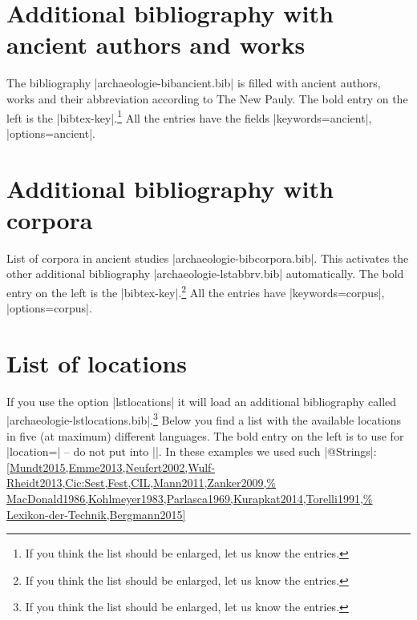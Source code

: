 \documentclass[a4paper,
10pt,
greek,
french,
spanish,
italian,
ngerman,
english
]{ltxdoc}
\begin{document}

\clearpage
\begin{multicols}{2}\footnotesize
\lstlistoflistings
\end{multicols}
\section{Additional bibliography with ancient authors and works}\label{list-bibancient}
The bibliography |archaeologie-bibancient.bib| is filled with ancient authors, works and their abbreviation according to  The New Pauly.
The bold entry on the left is the |bibtex-key|.\footnote{If you think the list should be enlarged, let us know the entries.}
All the entries have the fields  |keywords={ancient}|, |options={ancient}|.

\begin{multicols}{2}
	
\end{multicols}


\section{Additional bibliography with corpora}\label{list-bibcorpora}
List of corpora in ancient studies |archaeologie-bibcorpora.bib|.
This activates the other additional bibliography |archaeologie-lstabbrv.bib| automatically.
The bold entry on the left is the |bibtex-key|.\footnote{If you think the list should be enlarged, let us know the entries.}
All the entries have |keywords={corpus}|, |options={corpus}|.
\begin{multicols}{2}
	
\end{multicols}

\section{List of locations}\label{list-locations}
If you use the option |lstlocations| it will load an additional bibliography called |archaeologie-lstlocations.bib|.\footnote{If you think the list should be enlarged, let us know the entries.} 
Below you find a list with the available locations in five (at maximum) different languages.
The bold entry on the left is to use for |location=| -- do not put  into |{}|.
In these examples we used such |@Strings|:
\cref{Mundt2015,Emme2013,Neufert2002,Wulf-Rheidt2013,Cic:Sest,Fest,CIL,Mann2011,Zanker2009,%
MacDonald1986,Kohlmeyer1983,Parlasca1969,Kurapkat2014,Torelli1991,%
Lexikon-der-Technik,Bergmann2015}
\end{document}
